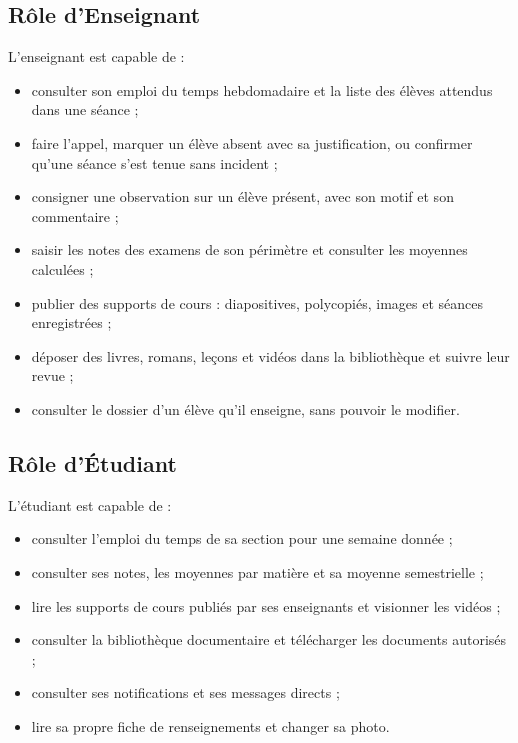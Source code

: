 \subsection{Rôle d'Enseignant}
L'enseignant est capable de :
\begin{itemize}
    \item consulter son emploi du temps hebdomadaire et la liste des élèves attendus dans une séance ;
    \item faire l'appel, marquer un élève absent avec sa justification, ou confirmer qu'une séance s'est
          tenue sans incident ;
    \item consigner une observation sur un élève présent, avec son motif et son commentaire ;
    \item saisir les notes des examens de son périmètre et consulter les moyennes calculées ;
    \item publier des supports de cours : diapositives, polycopiés, images et séances enregistrées ;
    \item déposer des livres, romans, leçons et vidéos dans la bibliothèque et suivre leur revue ;
    \item consulter le dossier d'un élève qu'il enseigne, sans pouvoir le modifier.
\end{itemize}

\subsection{Rôle d'Étudiant}
L'étudiant est capable de :
\begin{itemize}
    \item consulter l'emploi du temps de sa section pour une semaine donnée ;
    \item consulter ses notes, les moyennes par matière et sa moyenne semestrielle ;
    \item lire les supports de cours publiés par ses enseignants et visionner les vidéos ;
    \item consulter la bibliothèque documentaire et télécharger les documents autorisés ;
    \item consulter ses notifications et ses messages directs ;
    \item lire sa propre fiche de renseignements et changer sa photo.
\end{itemize}

